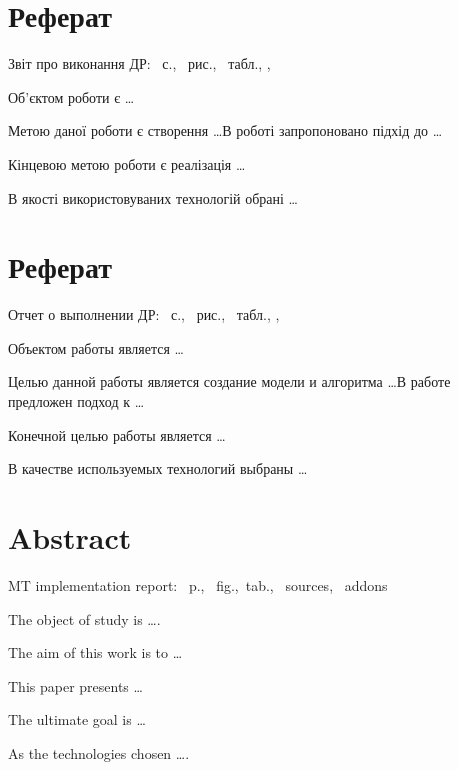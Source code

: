 \section*{Реферат}
\skipline
Звіт про виконання ДР:
~с., ~рис., ~табл.,
,
 \skipline

\skipline

Об'єктом роботи є \ldots

Метою даної роботи є створення \ldots В роботі запропоновано підхід до \ldots

Кінцевою метою роботи є реалізація \ldots

В якості використовуваних технологій обрані \ldots

\section*{Реферат}
\skipline
Отчет о выполнении ДР:
~с., ~рис., ~табл.,
,
 \skipline

\skipline

Объектом работы является \ldots

Целью данной работы является создание модели и алгоритма \ldots В работе предложен
подход к \ldots

Конечной целью работы является \ldots

В качестве используемых технологий выбраны \ldots

\section*{Abstract}
\skipline
MT implementation report:
~p., ~fig.,~tab.,
~sources, ~addons \skipline

\skipline

The object of study is \ldots.

The aim of this work is to \ldots

This paper presents \ldots

The ultimate goal is \ldots

As the technologies chosen \ldots.
